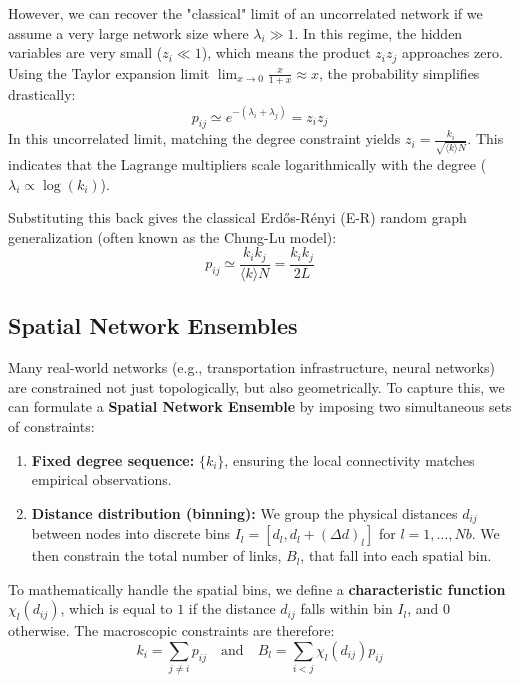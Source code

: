 However, we can recover the "classical" limit of an uncorrelated network if we assume a very large network size where \(\lambda_i \gg 1\). In this regime, the hidden variables are very small (\(z_i \ll 1\)), which means the product \(z_i z_j\) approaches zero. Using the Taylor expansion limit \(\lim_{x \to 0} \frac{x}{1+x} \approx x\), the probability simplifies drastically:
\[
    p_{ij} \simeq e^{-(\lambda_i + \lambda_j)} = z_i z_j
\]
In this uncorrelated limit, matching the degree constraint yields \(z_i = \frac{k_i}{\sqrt{\langle k \rangle N}}\). This indicates that the Lagrange multipliers scale logarithmically with the degree (\(\lambda_i \propto \log(k_i)\)).

Substituting this back gives the classical Erdős-Rényi (E-R) random graph generalization (often known as the Chung-Lu model):
\[
    p_{ij} \simeq \frac{k_i k_j}{\langle k \rangle N} = \frac{k_i k_j}{2L}
\]

\subsection{Spatial Network Ensembles}
\label{subsec:spatial_network_ensembles}

Many real-world networks (e.g., transportation infrastructure, neural networks) are constrained not just topologically, but also geometrically. To capture this, we can formulate a \textbf{Spatial Network Ensemble} by imposing two simultaneous sets of constraints:
\begin{enumerate}
    \item \textbf{Fixed degree sequence:} \(\{k_i\}\), ensuring the local connectivity matches empirical observations.
    \item \textbf{Distance distribution (binning):} We group the physical distances \(d_{ij}\) between nodes into discrete bins \(I_l = [d_l, d_l + (\Delta d)_l]\) for \(l = 1, \dots, Nb\). We then constrain the total number of links, \(B_l\), that fall into each spatial bin.
\end{enumerate}

To mathematically handle the spatial bins, we define a \textbf{characteristic function} \(\chi_l(d_{ij})\), which is equal to \(1\) if the distance \(d_{ij}\) falls within bin \(I_l\), and \(0\) otherwise. The macroscopic constraints are therefore:
\[
    k_i = \sum_{j \neq i} p_{ij} \quad \text{and} \quad B_l = \sum_{i<j} \chi_l(d_{ij}) p_{ij}
\]

